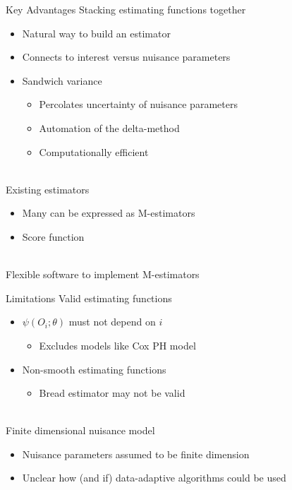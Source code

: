 \documentclass{beamer}
\begin{document}
\begin{frame}{Key Advantages}
	Stacking estimating functions together
	\begin{itemize}
		\item Natural way to build an estimator
		\item Connects to interest versus nuisance parameters
		\item Sandwich variance
		\begin{itemize}
			\item Percolates uncertainty of nuisance parameters
			\item Automation of the delta-method
			\item Computationally efficient
		\end{itemize}
	\end{itemize}~\\
	Existing estimators
	\begin{itemize}
		\item Many can be expressed as M-estimators
		\item Score function
	\end{itemize}~\\
	Flexible software to implement M-estimators
\end{frame}

\begin{frame}{Limitations}
	Valid estimating functions
	\begin{itemize}
		\item $\psi(O_i;\theta)$ must not depend on $i$
		\begin{itemize}
			\item Excludes models like Cox PH model
		\end{itemize}
		\item Non-smooth estimating functions
		\begin{itemize}
			\item Bread estimator may not be valid
		\end{itemize} 
	\end{itemize}~\\
	Finite dimensional nuisance model
	\begin{itemize}
		\item Nuisance parameters assumed to be finite dimension
		\item Unclear how (and if) data-adaptive algorithms could be used
	\end{itemize}
\end{frame}
\end{document}
